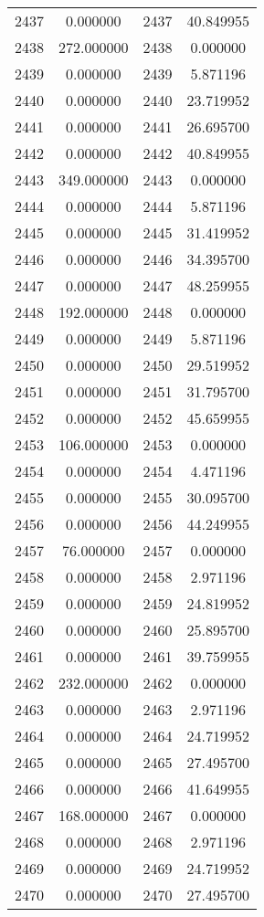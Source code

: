 \documentclass[12pt]{article}
\begin{document}
\begin{longtable}{@{}cccc@{}}
2437 & 0.000000 & 2437 & 40.849955 \\
2438 & 272.000000 & 2438 & 0.000000 \\
2439 & 0.000000 & 2439 & 5.871196 \\
2440 & 0.000000 & 2440 & 23.719952 \\
2441 & 0.000000 & 2441 & 26.695700 \\
2442 & 0.000000 & 2442 & 40.849955 \\
2443 & 349.000000 & 2443 & 0.000000 \\
2444 & 0.000000 & 2444 & 5.871196 \\
2445 & 0.000000 & 2445 & 31.419952 \\
2446 & 0.000000 & 2446 & 34.395700 \\
2447 & 0.000000 & 2447 & 48.259955 \\
2448 & 192.000000 & 2448 & 0.000000 \\
2449 & 0.000000 & 2449 & 5.871196 \\
2450 & 0.000000 & 2450 & 29.519952 \\
2451 & 0.000000 & 2451 & 31.795700 \\
2452 & 0.000000 & 2452 & 45.659955 \\
2453 & 106.000000 & 2453 & 0.000000 \\
2454 & 0.000000 & 2454 & 4.471196 \\
2455 & 0.000000 & 2455 & 30.095700 \\
2456 & 0.000000 & 2456 & 44.249955 \\
2457 & 76.000000 & 2457 & 0.000000 \\
2458 & 0.000000 & 2458 & 2.971196 \\
2459 & 0.000000 & 2459 & 24.819952 \\
2460 & 0.000000 & 2460 & 25.895700 \\
2461 & 0.000000 & 2461 & 39.759955 \\
2462 & 232.000000 & 2462 & 0.000000 \\
2463 & 0.000000 & 2463 & 2.971196 \\
2464 & 0.000000 & 2464 & 24.719952 \\
2465 & 0.000000 & 2465 & 27.495700 \\
2466 & 0.000000 & 2466 & 41.649955 \\
2467 & 168.000000 & 2467 & 0.000000 \\
2468 & 0.000000 & 2468 & 2.971196 \\
2469 & 0.000000 & 2469 & 24.719952 \\
2470 & 0.000000 & 2470 & 27.495700 \\

\end{longtable}
\end{document}
